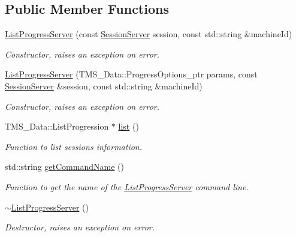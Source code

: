 \subsection*{Public Member Functions}
\begin{DoxyCompactItemize}
\item 
\hyperlink{classListProgressServer_a49042d8db19b90501711398c913d4b31}{ListProgressServer} (const \hyperlink{classSessionServer}{SessionServer} session, const std::string \&machineId)
\begin{DoxyCompactList}\small\item\em Constructor, raises an exception on error. \item\end{DoxyCompactList}\item 
\hyperlink{classListProgressServer_ab2de6df88e4616749465a398ae3f7c44}{ListProgressServer} (TMS\_\-Data::ProgressOptions\_\-ptr params, const \hyperlink{classSessionServer}{SessionServer} \&session, const std::string \&machineId)
\begin{DoxyCompactList}\small\item\em Constructor, raises an exception on error. \item\end{DoxyCompactList}\item 
TMS\_\-Data::ListProgression $\ast$ \hyperlink{classListProgressServer_a638132aca020d8168e5185df47e881f0}{list} ()
\begin{DoxyCompactList}\small\item\em Function to list sessions information. \item\end{DoxyCompactList}\item 
std::string \hyperlink{classListProgressServer_a9fefff901176f068962ab31ae42c25aa}{getCommandName} ()
\begin{DoxyCompactList}\small\item\em Function to get the name of the \hyperlink{classListProgressServer}{ListProgressServer} command line. \item\end{DoxyCompactList}\item 
\hypertarget{classListProgressServer_a61ed79d6958db9b81d298a9e2dce8382}{
\hyperlink{classListProgressServer_a61ed79d6958db9b81d298a9e2dce8382}{$\sim$ListProgressServer} ()}
\label{classListProgressServer_a61ed79d6958db9b81d298a9e2dce8382}

\begin{DoxyCompactList}\small\item\em Destructor, raises an exception on error. \item\end{DoxyCompactList}\end{DoxyCompactItemize}
